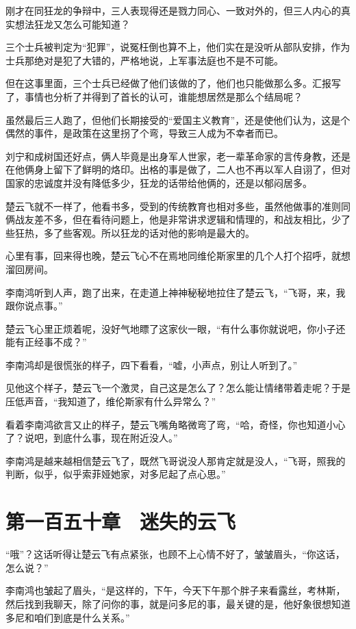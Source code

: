 刚才在同狂龙的争辩中，三人表现得还是戮力同心、一致对外的，但三人内心的真实想法狂龙又怎么可能知道？

三个士兵被判定为“犯罪”，说冤枉倒也算不上，他们实在是没听从部队安排，作为士兵那绝对是犯了大错的，严格地说，上军事法庭也不是不可能。

但在这事里面，三个士兵已经做了他们该做的了，他们也只能做那么多。汇报写了，事情也分析了并得到了首长的认可，谁能想居然是那么个结局呢？

虽然最后三人跑了，但他们长期接受的“爱国主义教育”，还是使他们认为，这是个偶然的事件，是政策在这里拐了个弯，导致三人成为不幸者而已。

刘宁和成树国还好点，俩人毕竟是出身军人世家，老一辈革命家的言传身教，还是在他俩身上留下了鲜明的烙印。出格的事是做了，二人也不再以军人自诩了，但对国家的忠诚度并没有降低多少，狂龙的话带给他俩的，还是以郁闷居多。

楚云飞就不一样了，他看书多，受到的传统教育也相对多些，虽然他做事的准则同俩战友差不多，但在看待问题上，他是非常讲求逻辑和情理的，和战友相比，少了些狂热，多了些客观。所以狂龙的话对他的影响是最大的。

心里有事，回来得也晚，楚云飞心不在焉地同维伦斯家里的几个人打个招呼，就想溜回房间。

李南鸿听到人声，跑了出来，在走道上神神秘秘地拉住了楚云飞，“飞哥，来，我跟你说点事。”

楚云飞心里正烦着呢，没好气地瞟了这家伙一眼，“有什么事你就说吧，你小子还能有正经事不成？”

李南鸿却是很慌张的样子，四下看看，“嘘，小声点，别让人听到了。”

见他这个样子，楚云飞一个激灵，自己这是怎么了？怎么能让情绪带着走呢？于是压低声音，“我知道了，维伦斯家有什么异常么？”

看着李南鸿欲言又止的样子，楚云飞嘴角略微弯了弯，“哈，奇怪，你也知道小心了？说吧，到底什么事，现在附近没人。”

李南鸿是越来越相信楚云飞了，既然飞哥说没人那肯定就是没人，“飞哥，照我的判断，似乎，似乎索菲娅她家，对多尼起了点心思。”

\section{第一百五十章　迷失的云飞}

“哦”？这话听得让楚云飞有点紧张，也顾不上心情不好了，皱皱眉头，“你这话，怎么说？”

李南鸿也皱起了眉头，“是这样的，下午，今天下午那个胖子来看露丝，考林斯，然后找到我聊天，除了问你的事，就是问多尼的事，最关键的是，他好象很想知道多尼和咱们到底是什么关系。”

